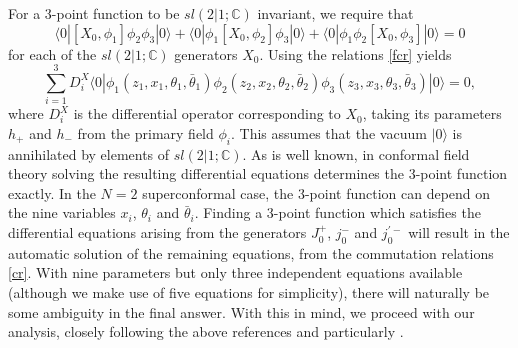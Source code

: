 \documentclass[a4paper,12pt]{article}
\def\thetabar    {\bar{\theta}}
\def\fsl         {sl(2|1;\mathbb C)}
\begin{document}
For a 3-point function to be $\fsl$ invariant, we require
that
\begin{equation}
\langle 0 | [X_0,\phi_1] \phi_2 \phi_3 | 0 \rangle + \langle
0 | \phi_1 [X_0,\phi_2] \phi_3 | 0 \rangle + \langle 0
| \phi_1 \phi_2 [X_0,\phi_3] | 0 \rangle =0
\end{equation}     
for each of the $\fsl$ generators $X_0$.  Using the relations
\eqref{fcr} yields
\begin{equation}
\label{des}
\sum_{i=1}^3 D^X_i \langle 0 | \phi_1 (z_1,x_1,\theta_1,\thetabar_1)
\phi_2 (z_2,x_2,\theta_2,\thetabar_2)
\phi_3(z_3,x_3,\theta_3,\thetabar_3) | 0 \rangle = 0,
\end{equation}
where $D_i^X$ is the differential operator corresponding to $X_0$,
taking its parameters $h_+$ and $h_-$ from the primary field
$\phi_i$.  This assumes that the vacuum $| 0 \rangle$ is
annihilated by elements of $\fsl$.  As is well known, in conformal
field theory solving the resulting differential equations determines
the 3-point function exactly.  In the $N=2$ superconformal
case, the 3-point function can depend on the nine variables $x_i$,
$\theta_i$ and $\thetabar_i$.  Finding a 3-point function which
satisfies the differential equations arising from the generators
$J_0^+$, $j_0^-$ and $j_0^{'-}$ will result in the automatic
solution of the remaining equations, from the commutation relations
\eqref{cr}.  With nine parameters but only three independent equations
available (although we make use of five equations for
simplicity), there will naturally be some ambiguity in the final answer. 
With this in mind, we proceed with our analysis, closely following the
above references and particularly \cite{West}.  
\end{document}
